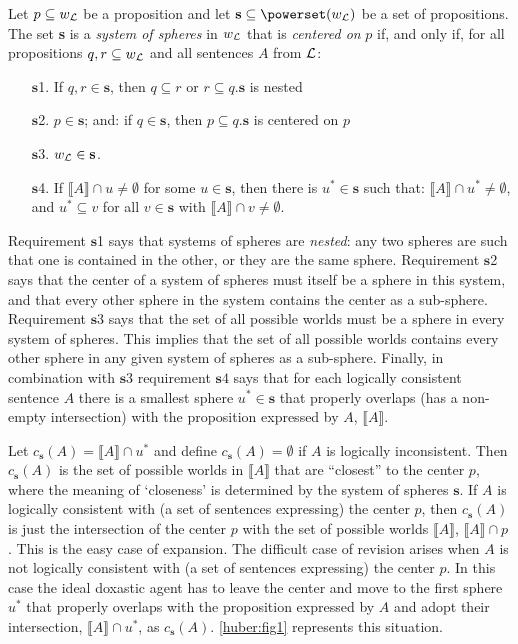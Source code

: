 Let $p\subseteq w_{\cal L}$ be a proposition and let $\textbf{s}\subseteq\powerset\!\left(w_{\cal L}\right)$ be a set of propositions. The set \textbf{s} is a \emph{system of spheres} in $w_{\cal L}$ that is \emph{centered on} $p$ if, and only if, for all propositions $q,r\subseteq w_{\cal L}$ and all sentences $A$ from $\cal L$:
\begin{enumerate}
\item[$\textbf{s}$1.] If $q,r\in\textbf{s}$, then $q\subseteq r$ or $r\subseteq q$.\hfill $\textbf{s}$ is nested
\item[$\textbf{s}$2.] $p\in\textbf{s}$; and: if $q\in\textbf{s}$, then $p\subseteq q$.\hfill $\textbf{s}$ is centered on $p$
\item[$\textbf{s}$3.] $w_{\cal L}\in\textbf{s}$.
\item[$\textbf{s}$4.] If $\llbracket A\rrbracket\cap u\neq\emptyset$ for some $u\in\textbf{s}$, then there is $u^*\in\textbf{s}$ such that: $\llbracket A\rrbracket\cap u^*\neq\emptyset$, and $u^*\subseteq v$ for all $v\in\textbf{s}$ with $\llbracket A\rrbracket\cap v\neq\emptyset$.
\end{enumerate}
Requirement $\textbf{s}$1 says that systems of spheres are \emph{nested}: any two spheres are such that one is contained in the other, or they are the same sphere. Requirement $\textbf{s}$2
says that the center of a system of spheres must itself be a sphere in this system, and that every other sphere in the system contains the center as a sub-sphere. Requirement $\textbf{s}$3 says that the set of all possible worlds must be a sphere in every system of spheres. This implies that the set of all possible worlds contains every other sphere in any given system of spheres as a sub-sphere. Finally, in combination with $\textbf{s}3$ requirement $\textbf{s}4$ says that for each logically consistent sentence $A$ there is a smallest sphere $u^*\in\textbf{s}$ that properly overlaps (has a non-empty intersection) with the proposition expressed by $A$, $\llbracket A\rrbracket$.

Let $c_{\textbf{s}}\left(A\right)=\llbracket A\rrbracket\cap u^*$ and define $c_{\textbf{s}}\left(A\right)=\emptyset$ if $A$ is logically inconsistent. Then $c_{\textbf{s}}\left(A\right)$ is the set of possible worlds in $\llbracket A\rrbracket$ that are ``closest'' to the center $p$, where the meaning of `closeness' is determined by the system of spheres $\textbf{s}$. If $A$ is logically consistent with (a set of sentences expressing) the center $p$, then $c_{\textbf{s}}\left(A\right)$ is just the intersection of the center $p$ with the set of possible worlds $\llbracket A\rrbracket$, $\llbracket A\rrbracket\cap p$. This is the easy case of expansion. The difficult case of revision arises when $A$ is not logically consistent with (a set of sentences expressing) the center $p$. In this case the ideal doxastic agent has to leave the center and move to the first sphere $u^*$ that properly overlaps with the proposition expressed by $A$ and adopt their intersection, $\llbracket A\rrbracket\cap u^*$, as $c_{\textbf{s}}\left(A\right)$. \autoref{huber:fig1} represents this situation.

